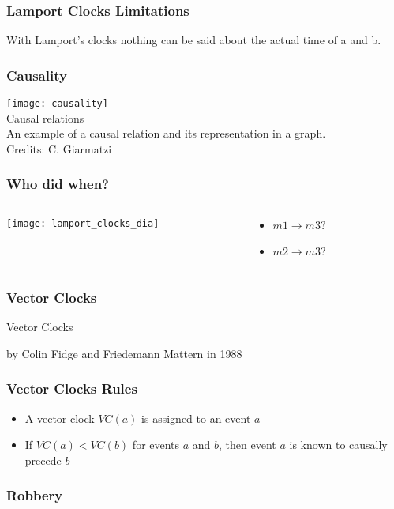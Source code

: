\documentclass[aspectratio=169, 15pt,usenames,dvipsnames]{beamer}
\begin{document}
{\begin{gdblank}
\begin{columns}
\begin{column}{0.5\textwidth}
\begin{itemize}
				\end{itemize}
			\end{column}	
		\end{columns}
	\end{gdblank}
	\begin{gdblank}
		\frametitle{Lamport Clocks Limitations}
		\centering
		\large		
		With Lamport’s clocks nothing can be said about the actual time of a and b.
	\end{gdblank}
	\begin{gdblank}
		\frametitle{Causality} 
		\texttt{[image: causality]}
		\centering\\Causal relations\\An example of a causal relation and its representation in a graph. 
		\tiny \\Credits: C. Giarmatzi
	\end{gdblank}   
	\begin{gdblank}
		\frametitle{Who did when?}
		\begin{columns}
			\begin{column}{0.5\textwidth}
				\texttt{[image: lamport\_clocks\_dia]}			
			\end{column}
			\begin{column}{0.5\textwidth}
				\begin{itemize}
					\item $m1 \rightarrow m3$?
					\item $m2 \rightarrow m3$? 
				\end{itemize}
			\end{column}	
		\end{columns}
	\end{gdblank}
	\begin{gdblank}
		\frametitle{Vector Clocks}
		\centering
		\LARGE
		Vector Clocks
		\par\large
		by Colin Fidge and Friedemann Mattern in 1988
	\end{gdblank}
	\begin{gdblank}
		\frametitle{Vector Clocks Rules}
		\centering
		\large
		\begin{itemize}
			\item A vector clock $VC(a)$ is assigned to an event $a$
			\item If $VC(a)<VC(b)$ for events $a$ and $b$, then event $a$ is known to causally precede $b$
		\end{itemize}
	\end{gdblank}
	\begin{gdblank}
		\frametitle{Robbery}
		\begin{columns}


\end{columns}
\end{gdblank}}
\end{document}
